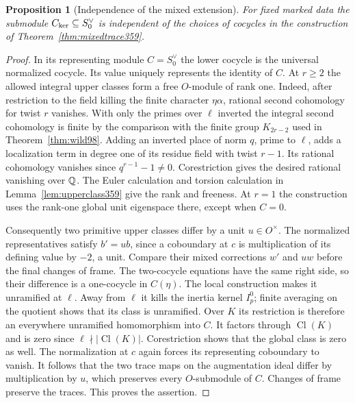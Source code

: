 \documentclass[a4paper,11pt]{article}
\newtheorem{proposition}{Proposition}[section]
\theoremstyle{definition}
\theoremstyle{remark}
\numberwithin{equation}{section}
\newcommand{\Cl}{\operatorname{Cl}}
\begin{document}
\begin{proposition}[Independence of the mixed extension]\label{prop:canonicaldefect360}
For fixed marked data the submodule \(C_{\rm ker}\subseteq
S_0^\vee\) is independent of the choices of cocycles in the
construction of Theorem~\ref{thm:mixedtrace359}.
\end{proposition}
\begin{proof}
In its representing module \(C=S_0^\vee\) the lower cocycle is
the universal normalized cocycle. Its value uniquely represents
the identity of \(C\). At \(r\ge2\) the allowed integral upper
classes form a free \(O\)-module of rank one. Indeed, after
restriction to the field killing the finite character
\(\eta\alpha\), rational second cohomology for twist \(r\)
vanishes. With only the primes over \(\ell\) inverted the
integral second cohomology is finite by the comparison with
the finite group \(K_{2r-2}\) used in Theorem~\ref{thm:wild98}.
Adding an inverted place of norm \(q\), prime to \(\ell\),
adds a localization term in degree one of its residue field
with twist \(r-1\). Its rational cohomology vanishes since
\(q^{r-1}-1\ne0\). Corestriction gives the desired rational
vanishing over \(\mathbb Q\). The Euler calculation and torsion
calculation in Lemma~\ref{lem:upperclass359} give the rank and
freeness. At \(r=1\) the construction uses the rank-one global
unit eigenspace there, except when \(C=0\).

Consequently two primitive upper classes differ by a unit
\(u\in O^\times\). The normalized representatives satisfy
\(b'=ub\), since a coboundary at \(c\) is multiplication of its
defining value by \(-2\), a unit. Compare their mixed corrections
\(w'\) and \(uw\) before the final changes of frame. The
two-cocycle equations have the same right side, so their
difference is a one-cocycle in \(C(\eta)\). The local construction
makes it unramified at \(\ell\). Away from \(\ell\) it kills the
inertia kernel \(I_p^0\); finite averaging on the quotient
shows that its class is unramified. Over \(K\) its restriction
is therefore an everywhere unramified homomorphism into \(C\).
It factors through \(\Cl(K)\) and is zero since
\(\ell\nmid|\Cl(K)|\). Corestriction shows that the global
class is zero as well. The normalization at \(c\) again forces
its representing coboundary to vanish. It follows that the
two trace maps on the augmentation ideal differ by multiplication
by \(u\), which preserves every \(O\)-submodule of \(C\).
Changes of frame preserve the traces. This proves the assertion.
\end{proof}
\end{document}
